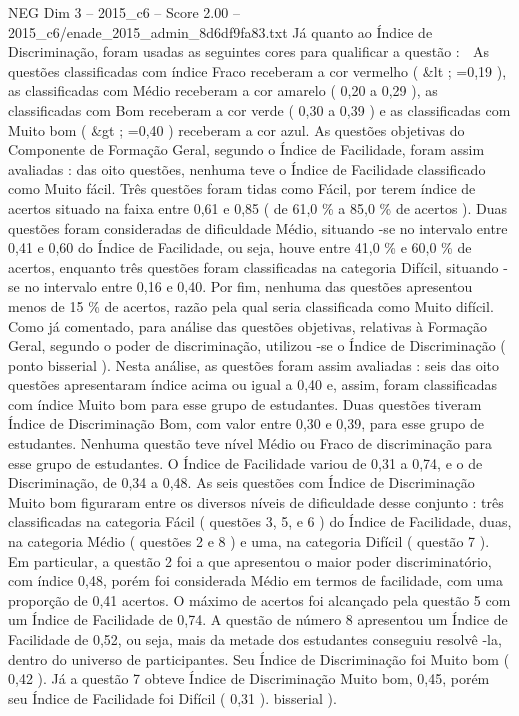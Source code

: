 \begin{textsample}{NEG Dim 3 – 2015\_c6 – Score 2.00 – 2015\_c6/enade\_2015\_admin\_8d6df9fa83.txt}
Já quanto ao Índice de Discriminação, foram usadas as seguintes cores para qualificar a questão :  As questões classificadas com índice Fraco receberam a cor vermelho ( \&lt ; =0,19 ), as classificadas com Médio receberam a cor amarelo ( 0,20 a 0,29 ), as classificadas com Bom receberam a cor verde ( 0,30 a 0,39 ) e as classificadas com Muito bom ( \&gt ; =0,40 ) receberam a cor azul.
As questões objetivas do Componente de Formação Geral, segundo o Índice de Facilidade, foram assim avaliadas : das oito questões, nenhuma teve o Índice de Facilidade classificado como Muito fácil.
Três questões foram tidas como Fácil, por terem índice de acertos situado na faixa entre 0,61 e 0,85 ( de 61,0 \% a 85,0 \% de acertos ).
Duas questões foram consideradas de dificuldade Médio, situando -se no intervalo entre 0,41 e 0,60 do Índice de Facilidade, ou seja, houve entre 41,0 \% e 60,0 \% de acertos, enquanto três questões foram classificadas na categoria Difícil, situando -se no intervalo entre 0,16 e 0,40.
Por fim, nenhuma das questões apresentou menos de 15 \% de acertos, razão pela qual seria classificada como Muito difícil.
Como já comentado, para análise das questões objetivas, relativas à Formação Geral, segundo o poder de discriminação, utilizou -se o Índice de Discriminação ( ponto bisserial ).
Nesta análise, as questões foram assim avaliadas : seis das oito questões apresentaram índice acima ou igual a 0,40 e, assim, foram classificadas com índice Muito bom para esse grupo de estudantes.
Duas questões tiveram Índice de Discriminação Bom, com valor entre 0,30 e 0,39, para esse grupo de estudantes.
Nenhuma questão teve nível Médio ou Fraco de discriminação para esse grupo de estudantes.
O Índice de Facilidade variou de 0,31 a 0,74, e o de Discriminação, de 0,34 a 0,48.
As seis questões com Índice de Discriminação Muito bom figuraram entre os diversos níveis de dificuldade desse conjunto : três classificadas na categoria Fácil ( questões 3, 5, e 6 ) do Índice de Facilidade, duas, na categoria Médio ( questões 2 e 8 ) e uma, na categoria Difícil ( questão 7 ).
Em particular, a questão 2 foi a que apresentou o maior poder discriminatório, com índice 0,48, porém foi considerada Médio em termos de facilidade, com uma proporção de 0,41 acertos.
O máximo de acertos foi alcançado pela questão 5 com um Índice de Facilidade de 0,74.
A questão de número 8 apresentou um Índice de Facilidade de 0,52, ou seja, mais da metade dos estudantes conseguiu resolvê -la, dentro do universo de participantes.
Seu Índice de Discriminação foi Muito bom ( 0,42 ).
Já a questão 7 obteve Índice de Discriminação Muito bom, 0,45, porém seu Índice de Facilidade foi Difícil ( 0,31 ). bisserial ).

\end{textsample}
